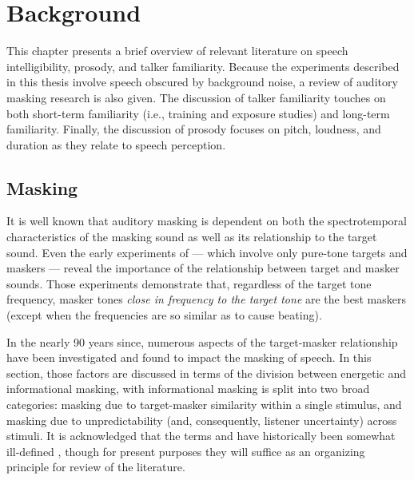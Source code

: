 \chapter{Background}
This chapter presents a brief overview of relevant literature on speech intelligibility, prosody, and talker familiarity.  Because the experiments described in this thesis involve speech obscured by background noise, a review of auditory masking research is also given.  The discussion of talker familiarity touches on both short-term familiarity (i.e., training and exposure studies) and long-term familiarity.  Finally, the discussion of prosody focuses on pitch, loudness, and duration as they relate to speech perception.

\section{Masking}
It is well known that auditory masking is dependent on both the spectrotemporal characteristics of the masking sound as well as its relationship to the target sound.  %
Even the early experiments of \citet{WegelLane1924} — which involve only pure-tone targets and maskers — reveal the importance of the relationship between target and masker sounds.  Those experiments demonstrate that, regardless of the target tone frequency, masker tones \emph{close in frequency to the target tone} are the best maskers (except when the frequencies are so similar as to cause beating).  

In the nearly 90 years since, numerous aspects of the target-masker relationship have been investigated and found to impact the masking of speech.  In this section, those factors are discussed %
in terms of the division between energetic and informational masking, with informational masking is split into two broad categories: masking due to target-masker similarity within a single stimulus, and masking due to unpredictability (and, consequently, listener uncertainty) across stimuli.  It is acknowledged that the terms  and  have historically been somewhat ill-defined \citep[cf.][]{DurlachEtAl2003a, Watson2005}, though for present purposes they will suffice as an organizing principle for review of the literature.%

